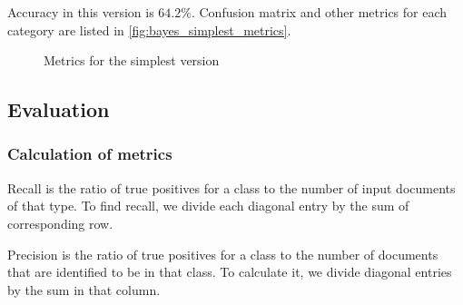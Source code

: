 Accuracy in this version is $64.2\%$. Confusion matrix and other metrics for each category are listed in \autoref{fig:bayes_simplest_metrics}.

\begin{figure}[htpb]
    \begin{tcolorbox}
        
    \end{tcolorbox}
    \caption{Metrics for the simplest version}
    \label{fig:bayes_simplest_metrics}
\end{figure}

\subsection{Evaluation}
\label{sec:bayes_evaluation}

\subsubsection{Calculation of metrics}
Recall is the ratio of true positives for a class to the number of input documents of that type. To find recall, we divide each diagonal entry by the sum of corresponding row.

Precision is the ratio of true positives for a class to the number of documents that are identified to be in that class. To calculate it, we divide diagonal entries by the sum in that column.

